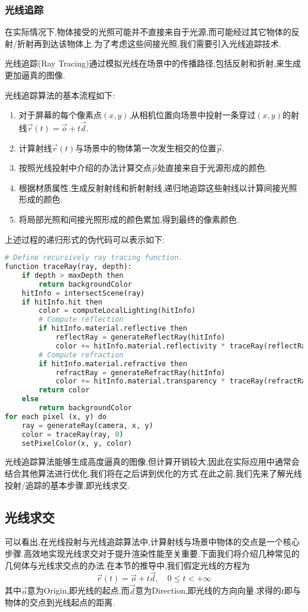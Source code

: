 \documentclass{ctexart}
\begin{document}
\subsubsection{光线追踪}
在实际情况下,物体接受的光照可能并不直接来自于光源,而可能经过其它物体的反射/折射再到达该物体上.为了考虑这些间接光照,我们需要引入光线追踪技术.
\begin{definition}[光线追踪]
    光线追踪(Ray Tracing)通过模拟光线在场景中的传播路径,包括反射和折射,来生成更加逼真的图像.
\end{definition}
光线追踪算法的基本流程如下:
\begin{enumerate}[label=\tbf{\arabic*.}]
    \item 对于屏幕的每个像素点$(x,y)$,从相机位置向场景中投射一条穿过$(x,y)$的射线$\vec{r}(t)=\vec{o}+t\vec{d}$.
    \item 计算射线$\vec{r}(t)$与场景中的物体第一次发生相交的位置$\vec{p}$.
    \item 按照光线投射中介绍的办法计算交点$\vec{p}$处直接来自于光源形成的颜色.
    \item 根据材质属性,生成反射射线和折射射线,递归地追踪这些射线以计算间接光照形成的颜色.
    \item 将局部光照和间接光照形成的颜色累加,得到最终的像素颜色.
\end{enumerate}
上述过程的递归形式的伪代码可以表示如下:
\begin{lstlisting}[language=python]
# Define recursively ray tracing function.
function traceRay(ray, depth):
    if depth > maxDepth then
        return backgroundColor
    hitInfo = intersectScene(ray)
    if hitInfo.hit then
        color = computeLocalLighting(hitInfo)
        # Compute reflection
        if hitInfo.material.reflective then
            reflectRay = generateReflectRay(hitInfo)
            color += hitInfo.material.reflectivity * traceRay(reflectRay, depth + 1)
        # Compute refraction
        if hitInfo.material.refractive then
            refractRay = generateRefractRay(hitInfo)
            color += hitInfo.material.transparency * traceRay(refractRay, depth + 1)
        return color
    else
        return backgroundColor
for each pixel (x, y) do
    ray = generateRay(camera, x, y)
    color = traceRay(ray, 0)
    setPixelColor(x, y, color)
\end{lstlisting}
光线追踪算法能够生成高度逼真的图像,但计算开销较大,因此在实际应用中通常会结合其他算法进行优化.我们将在之后讲到优化的方式.在此之前,我们先来了解光线投射/追踪的基本步骤,即光线求交.
\subsection{光线求交}
可以看出,在光线投射与光线追踪算法中,计算射线与场景中物体的交点是一个核心步骤.高效地实现光线求交对于提升渲染性能至关重要.下面我们将介绍几种常见的几何体与光线求交点的办法.在本节的推导中,我们假定光线的方程为
\[\vec{r}(t)=\vec{o}+t\vec{d},\quad 0\leq t<+\infty\]
其中$\vec{o}$意为Origin,即光线的起点,而$\vec{d}$意为Direction,即光线的方向向量.求得的$t$即与物体的交点到光线起点的距离.
\end{document}
